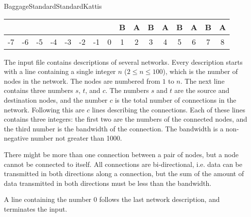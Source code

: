 \begin{problema}{Baggage}{Standard}{Standard}{Kattis}
\begin{center}
\begin{tabular}{c c c c c c c c c c c c c c c c } 
	\hline
	\multicolumn{1}{|c}{ } &
	\multicolumn{1}{|c}{ } &
	\multicolumn{1}{|c}{ } & 
	\multicolumn{1}{|c}{ } &
	\multicolumn{1}{|c}{ } &
	\multicolumn{1}{|c}{ } &
	\multicolumn{1}{|c}{ } &
	\multicolumn{1}{|c}{ } &
	\multicolumn{1}{|c}{B} & 
	\multicolumn{1}{|c}{A} &
	\multicolumn{1}{|c}{B} & 
	\multicolumn{1}{|c}{A} &
	\multicolumn{1}{|c}{B} &
	\multicolumn{1}{|c}{A} & 
	\multicolumn{1}{|c}{B} &
	\multicolumn{1}{|c|}{A} \\  \hline		
	\multicolumn{1}{c}{-7} &
	\multicolumn{1}{c}{-6} &
	\multicolumn{1}{c}{-5} & 
	\multicolumn{1}{c}{-4} &
	\multicolumn{1}{c}{-3} &
	\multicolumn{1}{c}{-2} &
	\multicolumn{1}{c}{-1} &
	\multicolumn{1}{c}{0} &
	\multicolumn{1}{c}{1} & 
	\multicolumn{1}{c}{2} &
	\multicolumn{1}{c}{3} & 
	\multicolumn{1}{c}{4} &
	\multicolumn{1}{c}{5} &
	\multicolumn{1}{c}{6} & 
	\multicolumn{1}{c}{7} &
	\multicolumn{1}{c}{8} \\	 
	
\end{tabular}
\label{sec:greetings}

\end{center}


\InputFile

The input file contains descriptions of several networks. Every description starts with a line containing a single integer $n$ ($2 \leq n \leq 100$), which is the number of nodes in the network. The nodes are numbered from $1$ to $n$. The next line contains three numbers $s$, $t$, and $c$. The numbers $s$ and $t$ are the source and destination nodes, and the number $c$ is the total number of connections in the network. Following this are $c$ lines describing the connections. Each of these lines contains three integers: the first two are the numbers of the connected nodes, and the third number is the bandwidth of the connection. The bandwidth is a non-negative number not greater than 1000. 

There might be more than one connection between a pair of nodes, but a node cannot be connected to itself. All connections are bi-directional, i.e. data can be transmitted in both directions along a connection, but the sum of the amount of data transmitted in both directions must be less than the bandwidth. 

A line containing the number $0$ follows the last network description, and terminates the input. 
 \\



\end{problema}
